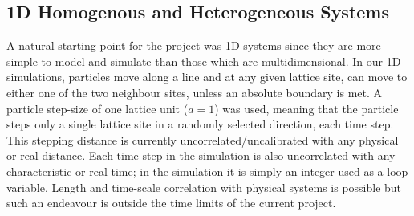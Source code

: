 %	    
%	    	
%	    	

\subsection{1D Homogenous and Heterogeneous Systems}
	A natural starting point for the project was 1D systems since they are more simple to model and simulate than those which are multidimensional. In our 1D simulations, particles move along a line and at any given lattice site, can move to either one of the two neighbour sites, unless an absolute boundary is met. A particle step-size of one lattice unit ($ a = 1 $) was used, meaning that the particle steps only a single lattice site in a randomly selected direction, each time step. This stepping distance is currently uncorrelated/uncalibrated with any physical or real distance. Each time step in the simulation is also uncorrelated with any characteristic or real time; in the simulation it is simply an integer used as a loop variable. Length and time-scale correlation with physical systems is possible but such an endeavour is outside the time limits of the current project.
	
